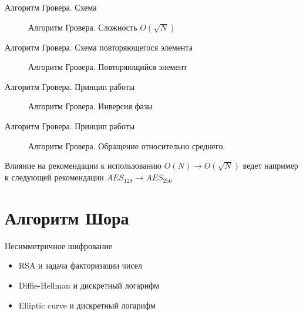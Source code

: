 \documentclass[10pt,pdf,hyperref={unicode}]{beamer}
\begin{document}
\begin{frame}{Алгоритм Гровера. Схема}
\begin{figure}
\centering

\scalebox{1.0}{}

\caption{Алгоритм Гровера. Сложность $ O(\sqrt{N})$}
\label{figQuantCompGrover}
\end{figure}
\end{frame}

\begin{frame}{Алгоритм Гровера. Схема повторяющегося элемента}
\begin{figure}
\centering

\scalebox{1.0}{}

\caption{Алгоритм Гровера. Повторяющийся элемент}
\label{figQuantCompGrover}
\end{figure}
\end{frame}


\begin{frame}{Алгоритм Гровера. Принцип работы}
\begin{figure}
\centering

\scalebox{.9}{}

\caption{Алгоритм Гровера. Инверсия фазы}
\label{figQuantCompGroverInv}
\end{figure}
\end{frame}

\begin{frame}{Алгоритм Гровера. Принцип работы}
\begin{figure}
\centering

\scalebox{.8}{}

\caption{Алгоритм Гровера. Обращение относительно
  среднего.}
\label{figQuantCompGroverInvMiddle}
\end{figure}

\end{frame}


\begin{frame}{Влияние на рекомендации к использованию}
$O(N) \rightarrow O(\sqrt{N})$
ведет например к следующей рекомендации
$AES_{128} \rightarrow AES_{256}$
\end{frame}


\section{Алгоритм Шора}
\begin{frame}{Несимметричное шифрование}
\begin{itemize}
\item RSA и задача факторизации чисел
\item Diffie-Hellman и дискретный логарифм
\item Elliptic curve и дискретный логарифм
\end{itemize}
\end{frame}
\end{document}
